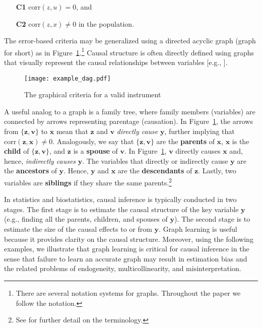 \documentclass[11pt,review,authoryear]{elsarticle}
\begin{document}
\begin{itemize}
  \item[\textbf{C1}] $\mathrm{corr} \left( z, u \right) = 0$, and
  \item[\textbf{C2}] $\mathrm{corr} \left( z, x \right) \neq 0$ in the population.
\end{itemize}

The error-based criteria may be generalized using a directed acyclic graph (graph for short) as in Figure~\ref{fig:example_dag}.\footnote{There are several notation systems for graphs. Throughout the paper we follow the \citet{koller2009probabilistic} notation.} Causal structure is often directly defined using graphs that visually represent the causal relationships between variables [e.g., \citet[p.~44]{spirtes2000causation}].
%
\begin{figure}[H]
  \centering
  \texttt{[image: example\_dag.pdf]}
  \caption{The graphical criteria for a valid instrument}
  \label{fig:example_dag}
\end{figure}
%
\noindent
A useful analog to a graph is a family tree, where family members (variables) are connected by arrows representing parentage (causation). In Figure~\ref{fig:example_dag}, the arrows from $\{\mathbf{z}, \mathbf{v}\}$ to $\mathbf{x}$ mean that $\mathbf{z}$ and $\mathbf{v}$ \emph{directly cause} $\mathbf{y}$, further implying that $\mathrm{corr} \left( \mathbf{z}, \mathbf{x} \right) \neq 0$. Analogously, we say that $\{\mathbf{z}, \mathbf{v}\}$ are the \textbf{parents} of $\mathbf{x}$, $\mathbf{x}$ is the \textbf{child} of $\{\mathbf{z}, \mathbf{v}\}$, and $\mathbf{z}$ is a \textbf{spouse} of $\mathbf{v}$. In Figure~\ref{fig:example_dag}, $\mathbf{v}$ directly causes $\mathbf{x}$ and, hence, \emph{indirectly causes} $\mathbf{y}$. The variables that directly or indirectly cause $\mathbf{y}$ are the \textbf{ancestors} of $\mathbf{y}$. Hence, $\mathbf{y}$ and $\mathbf{x}$ are the \textbf{descendants} of $\mathbf{z}$. Lastly, two variables are \textbf{siblings} if they share the same parents.\footnote{See \citet[Section 2.2]{koller2009probabilistic} for further detail on the terminology.}


In statistics and biostatistics, causal inference is typically conducted in two stages. The first stage is to estimate the causal structure of the key variable $\mathbf{y}$ (e.g., finding all the parents, children, and spouses of $\mathbf{y}$). The second stage is to estimate the size of the causal effects to or from $\mathbf{y}$. Graph learning is useful because it provides clarity on the causal structure. Moreover, using the following examples, we illustrate that graph learning is critical for causal inference in the sense that failure to learn an accurate graph may result in estimation bias and the related problems of endogeneity, multicollinearity, and misinterpretation.
\end{document}
